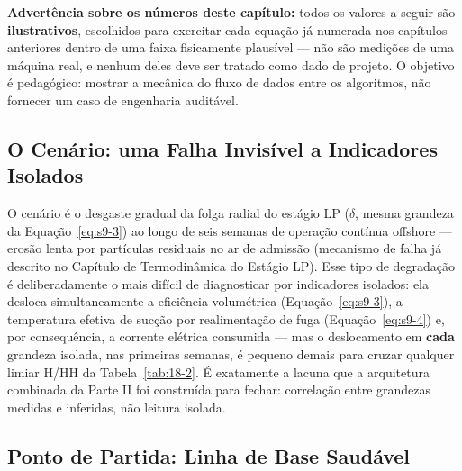 \documentclass[12pt,a4paper]{article}
\numberwithin{equation}{section}
\numberwithin{table}{section}
\numberwithin{figure}{section}
\begin{document}
{\textbf{Advertência sobre os números deste capítulo:} todos os valores a seguir são \textbf{ilustrativos}, escolhidos para exercitar cada equação já numerada nos capítulos anteriores dentro de uma faixa fisicamente plausível — não são medições de uma máquina real, e nenhum deles deve ser tratado como dado de projeto. O objetivo é pedagógico: mostrar a mecânica do fluxo de dados entre os algoritmos, não fornecer um caso de engenharia auditável.

\subsection{O Cenário: uma Falha Invisível a Indicadores Isolados}

O cenário é o desgaste gradual da folga radial do estágio LP ($\delta$, mesma grandeza da Equação~\eqref{eq:s9-3}) ao longo de seis semanas de operação contínua offshore — erosão lenta por partículas residuais no ar de admissão (mecanismo de falha já descrito no Capítulo de Termodinâmica do Estágio LP). Esse tipo de degradação é deliberadamente o mais difícil de diagnosticar por indicadores isolados: ela desloca simultaneamente a eficiência volumétrica (Equação~\eqref{eq:s9-3}), a temperatura efetiva de sucção por realimentação de fuga (Equação~\eqref{eq:s9-4}) e, por consequência, a corrente elétrica consumida — mas o deslocamento em \textbf{cada} grandeza isolada, nas primeiras semanas, é pequeno demais para cruzar qualquer limiar H/HH da Tabela~\ref{tab:18-2}. É exatamente a lacuna que a arquitetura combinada da Parte II foi construída para fechar: correlação entre grandezas medidas e inferidas, não leitura isolada.

\subsection{Ponto de Partida: Linha de Base Saudável}

}
\end{document}
